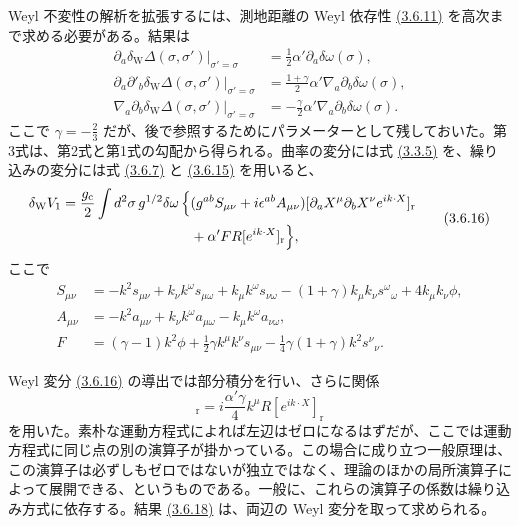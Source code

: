 Weyl 不変性の解析を拡張するには、測地距離の Weyl 依存性 \hyperref[eq:3.6.11]{(3.6.11)} を高次まで求める必要がある。結果は
\begin{align}
\left.\partial_a\delta_{\mathrm W}\Delta(\sigma,\sigma')
\right|_{\sigma'=\sigma}
&=\frac12\alpha'\partial_a\delta\omega(\sigma),
\tag{3.6.15a}\label{eq:3.6.15a}\\
\left.\partial_a\partial'_b\delta_{\mathrm W}\Delta(\sigma,\sigma')
\right|_{\sigma'=\sigma}
&=\frac{1+\gamma}{2}\alpha'\nabla_a\partial_b\delta\omega(\sigma),
\tag{3.6.15b}\label{eq:3.6.15b}\\
\left.\nabla_a\partial_b\delta_{\mathrm W}\Delta(\sigma,\sigma')
\right|_{\sigma'=\sigma}
&=-\frac{\gamma}{2}\alpha'\nabla_a\partial_b\delta\omega(\sigma).
\tag{3.6.15c}\label{eq:3.6.15c}
\end{align}
ここで $\gamma=-\frac23$ だが、後で参照するためにパラメーターとして残しておいた。第3式は、第2式と第1式の勾配から得られる。曲率の変分には式 \hyperref[eq:3.3.5]{(3.3.5)} を、繰り込みの変分には式 \hyperref[eq:3.6.7]{(3.6.7)} と \hyperref[eq:3.6.15a]{(3.6.15)} を用いると、
\begin{equation}
\begin{aligned}
\delta_{\mathrm W}V_1
=\frac{g_{\mathrm c}}2\int d^2\sigma\,g^{1/2}\delta\omega\,
\Bigl\{&(g^{ab}S_{\mu\nu}+i\epsilon^{ab}A_{\mu\nu})
[\partial_aX^\mu\partial_bX^\nu e^{ik\cdot X}]_{\mathrm r}\\
&+\alpha'FR[e^{ik\cdot X}]_{\mathrm r}\Bigr\},
\end{aligned}
\tag{3.6.16}\label{eq:3.6.16}
\end{equation}
ここで
\begin{align}
S_{\mu\nu}
&=-k^2s_{\mu\nu}+k_\nu k^\omega s_{\mu\omega}
+k_\mu k^\omega s_{\nu\omega}
-(1+\gamma)k_\mu k_\nu s^\omega{}_\omega
+4k_\mu k_\nu\phi,
\tag{3.6.17a}\label{eq:3.6.17a}\\
A_{\mu\nu}
&=-k^2a_{\mu\nu}+k_\nu k^\omega a_{\mu\omega}
-k_\mu k^\omega a_{\nu\omega},
\tag{3.6.17b}\label{eq:3.6.17b}\\
F&=(\gamma-1)k^2\phi+\frac12\gamma k^\mu k^\nu s_{\mu\nu}
-\frac14\gamma(1+\gamma)k^2s^\nu{}_\nu.
\tag{3.6.17c}\label{eq:3.6.17c}
\end{align}

Weyl 変分 \hyperref[eq:3.6.16]{(3.6.16)} の導出では部分積分を行い、さらに関係
\begin{equation}
[\nabla^2X^\mu e^{ik\cdot X}]_{\mathrm r}
=i\frac{\alpha'\gamma}{4}k^\mu R[e^{ik\cdot X}]_{\mathrm r}
\tag{3.6.18}\label{eq:3.6.18}
\end{equation}
を用いた。素朴な運動方程式によれば左辺はゼロになるはずだが、ここでは運動方程式に同じ点の別の演算子が掛かっている。この場合に成り立つ一般原理は、この演算子は必ずしもゼロではないが独立ではなく、理論のほかの局所演算子によって展開できる、というものである。一般に、これらの演算子の係数は繰り込み方式に依存する。結果 \hyperref[eq:3.6.18]{(3.6.18)} は、両辺の Weyl 変分を取って求められる。

